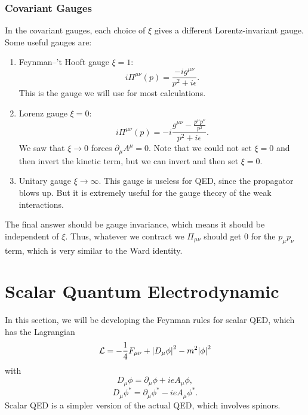 \documentclass[11pt]{article}
\theoremstyle{definition}
\begin{document}
\subsubsection{Covariant Gauges}
In the covariant gauges, each choice of \(\xi\) gives a different Lorentz-invariant gauge. Some useful gauges are:

\begin{enumerate}
    \item Feynman--'t Hooft gauge \(\xi = 1\):
\begin{equation}
i\Pi^{\mu\nu}(p) = \frac{-i g^{\mu\nu}}{p^2 + i\epsilon}.
\nonumber
\end{equation}
This is the gauge we will use for most calculations.


\item Lorenz gauge \(\xi = 0\):
\begin{equation}
i\Pi^{\mu\nu}(p) = -i \frac{ g^{\mu\nu} - \frac{p^{\mu} p^{\nu}}{p^2} }{p^2 + i\epsilon}.
\nonumber
\end{equation}
We saw that \(\xi \to 0\) forces \(\partial_{\mu} A^{\mu} = 0\). Note that we could not set \(\xi = 0\) and then invert the kinetic term, but we can invert and then set \(\xi = 0\).

\item Unitary gauge \(\xi \to \infty\). This gauge is useless for QED, since the propagator blows up. But it is extremely useful for the gauge theory of the weak interactions.
\end{enumerate}
The final answer should be gauge invariance, which means it should be independent of $\xi$. Thus, whatever we contract we $\Pi_{\mu\nu}$ should get 0 for the $p_\mu p_\nu$ term, which is very similar to the Ward identity. 

\section{Scalar Quantum Electrodynamic}
In this section, we will be developing the Feynman rules for scalar QED, which has the Lagrangian
\begin{equation}
    \mathcal{L} = -\frac{1}{4}F_{\mu\nu} + \abs{D_\mu\phi}^2 - m^2 \abs{\phi}^2
\end{equation}
with 
\begin{equation}
    D_\mu\phi = \partial_\mu\phi + ieA_\mu\phi,
\end{equation}
\begin{equation}
    D_\mu\phi^* = \partial_\mu\phi^* - ieA_\mu\phi^*.
\end{equation}
Scalar QED is a simpler version of the actual QED, which involves spinors.
\end{document}
